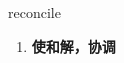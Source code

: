 
\begin{frame}
{\huge reconcile}
\begin{center}
\begin{enumerate}\Large
  \item \textbf{使和解，协调}
\end{enumerate}
\end{center}
\end{frame}
